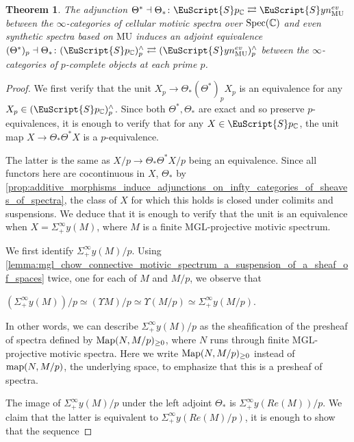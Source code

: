 \documentclass[oneside,a4paper]{amsart}
\newcommand{\euscr}[1]{\EuScript{#1}} %
\newcommand{\map}{\textnormal{map}} %
\newcommand{\Map}{\textnormal{Map}} %
\newcommand{\MU}{\mathrm{MU}} %
\newcommand{\MGL}{\mathrm{MGL}} %
\newcommand{\cspectra}{\euscr{S}p_{\mathbb{C}}} %
\newcommand{\synspectra}{\euscr{S}yn} %
\newcommand{\pcomplete}{^{\wedge} _{p}} %
\newcommand{\sigmainfty}{\Sigma^{\infty}_{+}} %
\theoremstyle{plain}
\newtheorem{thm}{Theorem}[section]
\theoremstyle{definition}
\theoremstyle{remark}
\begin{document}
\begin{thm}
\label{thm:after_p_completion_motivic_category_coincides_with_even_synthetic_spectra}
The adjunction $\Theta^{*} \dashv \Theta_{*} \colon \cspectra \rightleftarrows \synspectra_{\MU}^{ev}$ between the $\infty$-categories of cellular motivic spectra over $\textnormal{Spec}(\mathbb{C})$ and even synthetic spectra based on $\MU$ induces an adjoint equivalence $(\Theta^{*})_{p} \dashv \Theta_{*} \colon (\cspectra) \pcomplete \rightleftarrows (\synspectra_{\MU}^{ev}) \pcomplete$ between the $\infty$-categories of $p$-complete objects at each prime $p$. 
\end{thm}

\begin{proof}
We first verify that the unit $X_{p} \rightarrow \Theta_{*} (\Theta^{*})_{p} X_{p}$ is an equivalence for any $X_{p} \in (\cspectra) \pcomplete$. Since both $\Theta^{*}, \Theta_{*}$ are exact and so preserve $p$-equivalences, it is enough to verify that for any $X \in \cspectra$, the unit map $X \rightarrow \Theta_{*} \Theta^{*} X$ is a $p$-equivalence. 

The latter is the same as $X / p \rightarrow \Theta_{*} \Theta^{*} X / p$ being an equivalence. Since all functors here are cocontinuous in $X$, $\Theta_{*}$ by \cref{prop:additive_morphisms_induce_adjunctions_on_infty_categories_of_sheaves_of_spectra}, the class of $X$ for which this holds is closed under colimits and suspensions. We deduce that it is enough to verify that the unit is an equivalence when $X = \Sigma^{\infty}_{+} y(M)$, where $M$ is a finite $\MGL$-projective motivic spectrum. 

We first identify $\sigmainfty y(M) / p$. Using \cref{lemma:mgl_chow_connective_motivic_spectrum_a_suspension_of_a_sheaf_of_spaces} twice, one for each of $M$ and $M / p$, we observe that 

\begin{center}
$(\sigmainfty y(M))  / p \simeq (\Upsilon M) / p \simeq \Upsilon (M / p) \simeq \sigmainfty y(M / p)$.
\end{center}
In other words, we can describe $\sigmainfty y(M) / p$ as the sheafification of the presheaf of spectra defined by $\Map(N, M / p)_{\geq 0}$, where $N$ runs through finite $\MGL$-projective motivic spectra. Here we write $\Map(N, M / p)_{\geq 0}$ instead of $\map(N, M /p)$, the underlying space, to emphasize that this is a presheaf of spectra.

The image of $\sigmainfty y(M) / p$ under the left adjoint $\Theta_{*}$ is $\sigmainfty y(Re(M)) / p$. We claim that the latter is equivalent to $\sigmainfty y(Re(M)/p)$, it is enough to show that the sequence


\end{proof}
\end{document}
